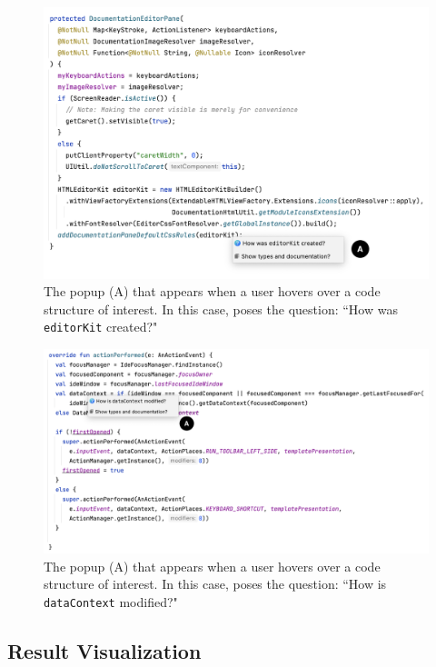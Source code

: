 \begin{figure}[ht]
\centering
\includegraphics[width=\textwidth]{./figs/reach-hover-invoke.png}
\caption{
  The \toolname{} popup (A) that appears when a user hovers over a code
  structure of interest. In this case, \toolname{} poses the question:
  ``How was \texttt{editorKit} created?"
}
\label{fig:ReachHoverInvokeBackward}
\end{figure}

\begin{figure}[ht]
\centering
\includegraphics[width=\textwidth]{./figs/reach-hover-invoke-forward.png}
\caption{
  The \toolname{} popup (A) that appears when a user hovers over a code
  structure of interest. In this case, \toolname{} poses the question:
  ``How is \texttt{dataContext} modified?"
}
\label{fig:ReachHoverInvokeForward}
\end{figure}

\subsection{Result Visualization}
\label{subsection:ResultVisualization}

